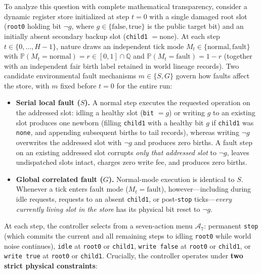 \documentclass[11pt,a4paper]{article}
\newcounter{none}
\providecommand{\tightlist}{\setlength{\itemsep}{2pt}\setlength{\parskip}{0pt}}
\begin{document}
To analyze this question with complete mathematical transparency,
consider a dynamic register store initialized at step \(t = 0\) with a
single damaged root slot (\texttt{root0} holding bit \(\neg g\), where
\(g \in \{\mathrm{false}, \mathrm{true}\}\) is the public target bit)
and an initially absent secondary backup slot (\texttt{child1}
\(= \mathrm{none}\)). At each step \(t \in \{0, \dots, H-1\}\), nature
draws an independent tick mode
\(M_t \in \{\mathrm{normal}, \mathrm{fault}\}\) with
\(\mathbb{P}(M_t = \mathrm{normal}) = r \in [0,1] \cap \mathbb{Q}\) and
\(\mathbb{P}(M_t = \mathrm{fault}) = 1 - r\) (together with an
independent fair birth label retained in world lineage records). Two
candidate environmental fault mechanisms \(m \in \{S, G\}\) govern how
faults affect the store, with \(m\) fixed before \(t=0\) for the entire
run:

\begin{itemize}
\tightlist
\item
  \textbf{Serial local fault (\(S\)).} A normal step executes the
  requested operation on the addressed slot: idling a healthy slot
  (\texttt{bit} \(= g\)) or writing \(g\) to an existing slot produces
  one newborn (filling \texttt{child1} with a healthy bit \(g\) if
  \texttt{child1} was \texttt{none}, and appending subsequent births to
  tail records), whereas writing \(\neg g\) overwrites the addressed
  slot with \(\neg g\) and produces zero births. A fault step on an
  existing addressed slot corrupts \emph{only that addressed slot} to
  \(\neg g\), leaves undispatched slots intact, charges zero write fee,
  and produces zero births.
\item
  \textbf{Global correlated fault (\(G\)).} Normal-mode execution is
  identical to \(S\). Whenever a tick enters fault mode
  (\(M_t = \mathrm{fault}\)), however---including during idle requests,
  requests to an absent \texttt{child1}, or post-\texttt{stop}
  ticks---\emph{every currently living slot in the store} has its
  physical bit reset to \(\neg g\).
\end{itemize}

At each step, the controller selects from a seven-action menu
\(\mathcal{A}_7\): permanent \texttt{stop} (which commits the current
and all remaining steps to idling \texttt{root0} while world noise
continues), \texttt{idle} at \texttt{root0} or \texttt{child1},
\texttt{write\ false} at \texttt{root0} or \texttt{child1}, or
\texttt{write\ true} at \texttt{root0} or \texttt{child1}. Crucially,
the controller operates under \textbf{two strict physical constraints}:
\end{document}
